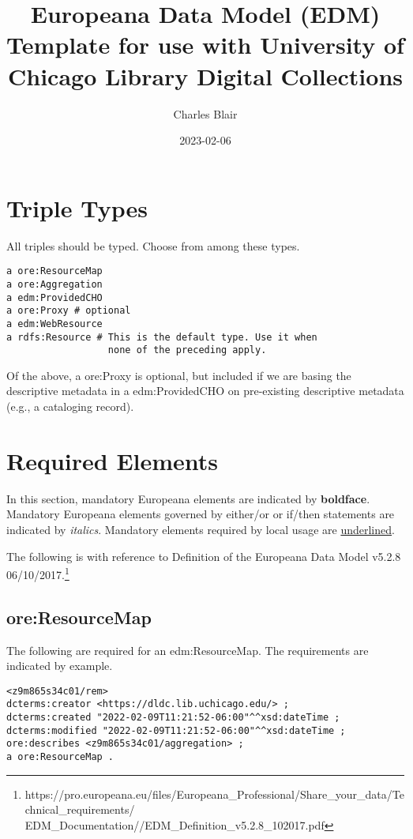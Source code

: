 \documentclass[11pt]{article}
\date{2023-02-06}
\title{Europeana Data Model (EDM) Template for use with University of Chicago Library Digital Collections}
\author{Charles Blair}
\begin{document}
\maketitle

\section{Triple Types}
All triples should be typed. Choose from among these types.

\begin{lstlisting}
a ore:ResourceMap
a ore:Aggregation
a edm:ProvidedCHO
a ore:Proxy # optional
a edm:WebResource
a rdfs:Resource # This is the default type. Use it when
                  none of the preceding apply.
\end{lstlisting}

Of the above, a ore:Proxy is optional, but included if we are basing the descriptive metadata in a edm:ProvidedCHO on pre-existing descriptive metadata (e.g., a cataloging record).

\section{Required Elements}
In this section, mandatory Europeana elements are indicated by \textbf{boldface}. Mandatory Europeana elements governed by either/or or if/then statements are indicated by \textit{italics}. Mandatory elements required by local usage are \underline{underlined}.

The following is with reference to Definition of the Europeana Data Model v5.2.8 06/10/2017.\footnote{https://pro.europeana.eu/files/Europeana\_Professional/Share\_your\_data/Technical\_requirements/
EDM\_Documentation//EDM\_Definition\_v5.2.8\_102017.pdf}

\subsection{ore:ResourceMap}

The following are required for an edm:ResourceMap. The requirements are indicated by example.

\begin{verbatim}
<z9m865s34c01/rem>
dcterms:creator <https://dldc.lib.uchicago.edu/> ;
dcterms:created "2022-02-09T11:21:52-06:00"^^xsd:dateTime ;
dcterms:modified "2022-02-09T11:21:52-06:00"^^xsd:dateTime ;
ore:describes <z9m865s34c01/aggregation> ;
a ore:ResourceMap .
\end{verbatim}
\end{document}

